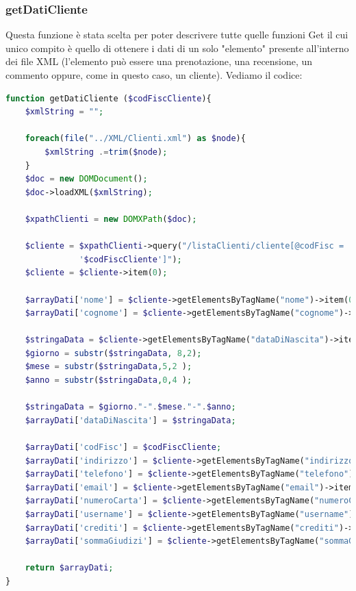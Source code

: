 \documentclass [a4paper, 12pt]{book}
\begin{document}
\subsubsection{getDatiCliente}
Questa funzione è stata scelta per poter descrivere tutte quelle funzioni Get il cui unico compito è quello di ottenere i dati di un solo "elemento" presente all'interno dei file XML (l'elemento può essere una prenotazione, una recensione, un commento oppure, come in questo caso, un cliente). Vediamo il codice:
\begin{lstlisting}[style=XML , language=PHP]
function getDatiCliente ($codFiscCliente){
    $xmlString = "";

    foreach(file("../XML/Clienti.xml") as $node){
        $xmlString .=trim($node);
    }
    $doc = new DOMDocument();
    $doc->loadXML($xmlString);

    $xpathClienti = new DOMXPath($doc);

    $cliente = $xpathClienti->query("/listaClienti/cliente[@codFisc = 
               '$codFiscCliente']");
    $cliente = $cliente->item(0);

    $arrayDati['nome'] = $cliente->getElementsByTagName("nome")->item(0)->textContent;
    $arrayDati['cognome'] = $cliente->getElementsByTagName("cognome")->item(0)->textContent;

    $stringaData = $cliente->getElementsByTagName("dataDiNascita")->item(0)->textContent;
    $giorno = substr($stringaData, 8,2);       
    $mese = substr($stringaData,5,2 );
    $anno = substr($stringaData,0,4 );

    $stringaData = $giorno."-".$mese."-".$anno;
    $arrayDati['dataDiNascita'] = $stringaData;

    $arrayDati['codFisc'] = $codFiscCliente;
    $arrayDati['indirizzo'] = $cliente->getElementsByTagName("indirizzo")->item(0)->textContent;
    $arrayDati['telefono'] = $cliente->getElementsByTagName("telefono")->item(0)->textContent;
    $arrayDati['email'] = $cliente->getElementsByTagName("email")->item(0)->textContent;
    $arrayDati['numeroCarta'] = $cliente->getElementsByTagName("numeroCarta")->item(0)->textContent;
    $arrayDati['username'] = $cliente->getElementsByTagName("username")->item(0)->textContent;
    $arrayDati['crediti'] = $cliente->getElementsByTagName("crediti")->item(0)->textContent;
    $arrayDati['sommaGiudizi'] = $cliente->getElementsByTagName("sommaGiudizi")->item(0)->textContent;
    
    return $arrayDati;
}
\end{lstlisting}
\end{document}
